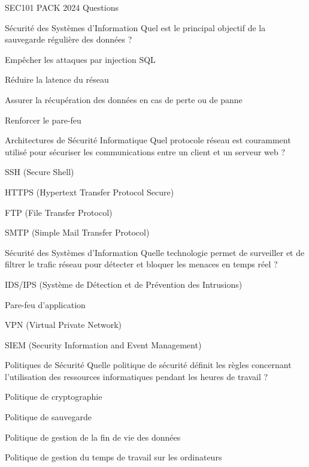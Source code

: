 \documentclass[12pt]{article}
\begin{document}
\begin{quiz}{SEC101 PACK 2024 Questions}
  \begin{multi}[points=1]{Sécurité des Systèmes d'Information}
    Quel est le principal objectif de la sauvegarde régulière des données ?
    \item Empêcher les attaques par injection SQL
    \item Réduire la latence du réseau
    \item* Assurer la récupération des données en cas de perte ou de panne
    \item Renforcer le pare-feu
  \end{multi}

  \begin{multi}[points=1]{Architectures de Sécurité Informatique}
    Quel protocole réseau est couramment utilisé pour sécuriser les communications entre un client et un serveur web ?
    \item SSH (Secure Shell)
    \item* HTTPS (Hypertext Transfer Protocol Secure)
    \item FTP (File Transfer Protocol)
    \item SMTP (Simple Mail Transfer Protocol)
  \end{multi}

  \begin{multi}[points=1]{Sécurité des Systèmes d'Information}
    Quelle technologie permet de surveiller et de filtrer le trafic réseau pour détecter et bloquer les menaces en temps réel ?
    \item* IDS/IPS (Système de Détection et de Prévention des Intrusions)
    \item Pare-feu d'application
    \item VPN (Virtual Private Network)
    \item SIEM (Security Information and Event Management)
  \end{multi}

  \begin{multi}[points=1]{Politiques de Sécurité}
    Quelle politique de sécurité définit les règles concernant l'utilisation des ressources informatiques pendant les heures de travail ?
    \item Politique de cryptographie
    \item Politique de sauvegarde
    \item Politique de gestion de la fin de vie des données
    \item* Politique de gestion du temps de travail sur les ordinateurs
  \end{multi}


\end{quiz}
\end{document}
